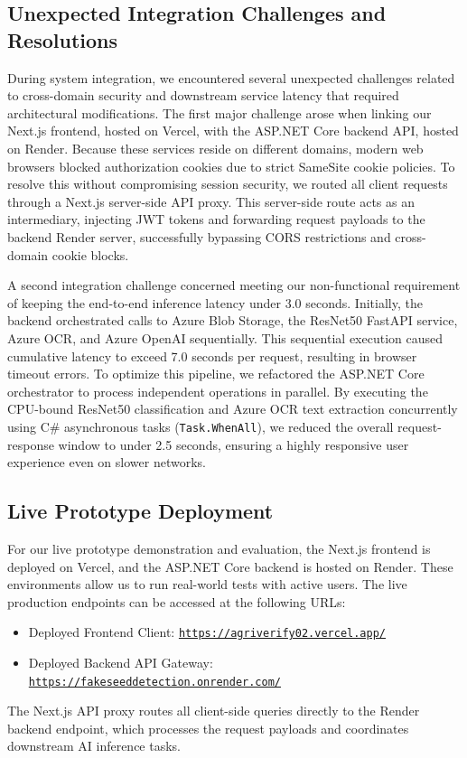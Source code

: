 \subsection{Unexpected Integration Challenges and Resolutions}

During system integration, we encountered several unexpected challenges related to cross-domain security and downstream service latency that required architectural modifications. The first major challenge arose when linking our Next.js frontend, hosted on Vercel, with the ASP.NET Core backend API, hosted on Render. Because these services reside on different domains, modern web browsers blocked authorization cookies due to strict SameSite cookie policies. To resolve this without compromising session security, we routed all client requests through a Next.js server-side API proxy. This server-side route acts as an intermediary, injecting JWT tokens and forwarding request payloads to the backend Render server, successfully bypassing CORS restrictions and cross-domain cookie blocks.

A second integration challenge concerned meeting our non-functional requirement of keeping the end-to-end inference latency under 3.0 seconds. Initially, the backend orchestrated calls to Azure Blob Storage, the ResNet50 FastAPI service, Azure OCR, and Azure OpenAI sequentially. This sequential execution caused cumulative latency to exceed 7.0 seconds per request, resulting in browser timeout errors. To optimize this pipeline, we refactored the ASP.NET Core orchestrator to process independent operations in parallel. By executing the CPU-bound ResNet50 classification and Azure OCR text extraction concurrently using C\# asynchronous tasks (\texttt{Task.WhenAll}), we reduced the overall request-response window to under 2.5 seconds, ensuring a highly responsive user experience even on slower networks.

\subsection{Live Prototype Deployment}
For our live prototype demonstration and evaluation, the Next.js frontend is deployed on Vercel, and the ASP.NET Core backend is hosted on Render. These environments allow us to run real-world tests with active users. The live production endpoints can be accessed at the following URLs:
\begin{itemize}[nosep, topsep=2pt]
    \item Deployed Frontend Client: \href{https://agriverify02.vercel.app/}{\nolinkurl{https://agriverify02.vercel.app/}}
    \item Deployed Backend API Gateway: \href{https://fakeseeddetection.onrender.com/}{\nolinkurl{https://fakeseeddetection.onrender.com/}}
\end{itemize}
The Next.js API proxy routes all client-side queries directly to the Render backend endpoint, which processes the request payloads and coordinates downstream AI inference tasks.